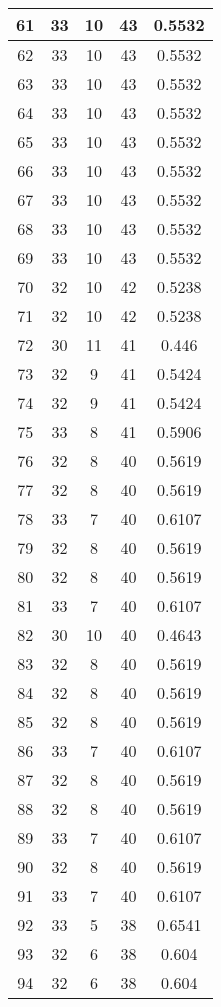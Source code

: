 \documentclass[letterpaper, 12pt]{article}
\begin{document}
\begin{longtable}{|c|c|c|c|c|}
\hline
61 & 33 & 10 & 43 & 0.5532 \\
\hline
62 & 33 & 10 & 43 & 0.5532 \\
\hline
63 & 33 & 10 & 43 & 0.5532 \\
\hline
64 & 33 & 10 & 43 & 0.5532 \\
\hline
65 & 33 & 10 & 43 & 0.5532 \\
\hline
66 & 33 & 10 & 43 & 0.5532 \\
\hline
67 & 33 & 10 & 43 & 0.5532 \\
\hline
68 & 33 & 10 & 43 & 0.5532 \\
\hline
69 & 33 & 10 & 43 & 0.5532 \\
\hline
70 & 32 & 10 & 42 & 0.5238 \\
\hline
71 & 32 & 10 & 42 & 0.5238 \\
\hline
72 & 30 & 11 & 41 & 0.446 \\
\hline
73 & 32 & 9 & 41 & 0.5424 \\
\hline
74 & 32 & 9 & 41 & 0.5424 \\
\hline
75 & 33 & 8 & 41 & 0.5906 \\
\hline
76 & 32 & 8 & 40 & 0.5619 \\
\hline
77 & 32 & 8 & 40 & 0.5619 \\
\hline
78 & 33 & 7 & 40 & 0.6107 \\
\hline
79 & 32 & 8 & 40 & 0.5619 \\
\hline
80 & 32 & 8 & 40 & 0.5619 \\
\hline
81 & 33 & 7 & 40 & 0.6107 \\
\hline
82 & 30 & 10 & 40 & 0.4643 \\
\hline
83 & 32 & 8 & 40 & 0.5619 \\
\hline
84 & 32 & 8 & 40 & 0.5619 \\
\hline
85 & 32 & 8 & 40 & 0.5619 \\
\hline
86 & 33 & 7 & 40 & 0.6107 \\
\hline
87 & 32 & 8 & 40 & 0.5619 \\
\hline
88 & 32 & 8 & 40 & 0.5619 \\
\hline
89 & 33 & 7 & 40 & 0.6107 \\
\hline
90 & 32 & 8 & 40 & 0.5619 \\
\hline
91 & 33 & 7 & 40 & 0.6107 \\
\hline
92 & 33 & 5 & 38 & 0.6541 \\
\hline
93 & 32 & 6 & 38 & 0.604 \\
\hline
94 & 32 & 6 & 38 & 0.604 \\
\hline

\end{longtable}
\end{document}
